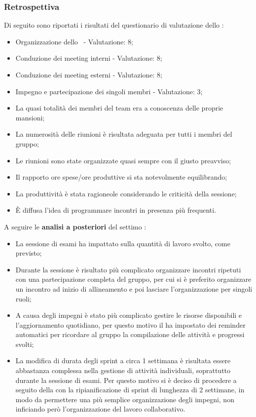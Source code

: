 \subsubsection{Retrospettiva}

\par Di seguito sono riportati i risultati del questionario di valutazione dello :
\begin{itemize}
  \item Organizzazione dello \ - Valutazione: 8;
  \item Conduzione dei meeting interni - Valutazione: 8;
  \item Conduzione dei meeting esterni - Valutazione: 8;
  \item Impegno e partecipazione dei singoli membri - Valutazione: 3;
  \item La quasi totalità dei membri del team era a conoscenza delle proprie mansioni;
  \item La numerosità delle riunioni è risultata adeguata per tutti i membri del gruppo;
  \item Le riunioni sono state organizzate quasi sempre con il giusto preavviso;
  \item Il rapporto ore spese/ore produttive si sta notevolmente equilibrando;
  \item La produttività è stata ragioneole considerando le criticità della sessione;
  \item È diffusa l'idea di programmare incontri in presenza più frequenti.
\end{itemize}

\vspace{0.5\baselineskip}
\par A seguire le \textbf{analisi a posteriori} del settimo :
\begin{itemize}
  \item La sessione di esami ha impattato sulla quantità di lavoro svolto, come previsto;
  \item Durante la sessione è risultato più complicato organizzare incontri ripetuti con una partecipazione completa del gruppo, per cui si è preferito organizzare un incontro ad inizio  di allineamento e poi lasciare l'organizzazione per singoli ruoli;
  \item A causa degli impegni è stato più complicato gestire le risorse disponibili e l'aggiornamento quotidiano, per questo motivo il \Responsabile{} ha impostato dei reminder automatici per ricordare al gruppo la compilazione delle attività e progressi svolti;
  \item La modifica di durata degli sprint a circa 1 settimana è risultata essere abbastanza complessa nella gestione di attività individuali, soprattutto durante la sessione di esami. Per questo motivo si è deciso di procedere a seguito della  con la ripianificazione di sprint di lunghezza di 2 settimane, in modo da permettere una più semplice organizzazione degli impegni, non inficiando però l'organizzazione del lavoro collaborativo.
\end{itemize}

